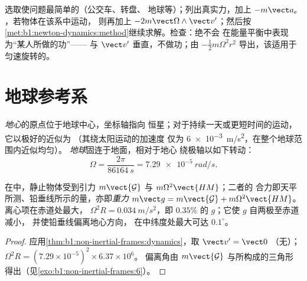 \begin{method}[在非惯性参考系中求解]\label{met:b1:non-inertial-frames:method}
选取使问题最简单的（公交车、转盘、
地球等）；列出真实力，加上 $-m\vect a_e$，若物体在该系中运动，
则再加上 $-2m\vect\Omega\wedge\vect v'$；然后按
\cref{met:b1:newton-dynamics:method}继续求解。检查：绝不会
在能量平衡中表现为“某人所做的功”——
与 $\vect v'$ 垂直，不做功；由
$-\tfrac12 m\Omega^2r^2$ 导出，该适用于
匀速旋转的。
\end{method}

\section{地球参考系}

\begin{definition}[地心参考系与地球参考系]\label{def:b1:non-inertial-frames:earth}
\emph{地心}的原点位于地球中心，坐标轴指向
恒星；对于持续一天或更短时间的运动，它以极好的近似为
（其绕太阳运动的加速度
仅为 \qty{6e-3}{m/s^2}，在整个地球范围内近似均匀）。
\emph{地球}固连于地面，相对于地心
绕极轴以如下转动：
\[
\Omega = \frac{2\pi}{\qty{86164}{s}} = \qty{7.29e-5}{rad/s} .
\]
\end{definition}

\begin{proposition}[重力，以及 $g$ 的变化]\label{prop:b1:non-inertial-frames:weight}
在中，静止物体受到引力
$m\vect{\mathcal G}$ 与 $m\Omega^2\vect{HM}$；二者的
合力即天平所测、铅垂线所示的量，亦即\emph{重力}
$m\vect g = m\vect{\mathcal G} + m\Omega^2\vect{HM}$。离心项在赤道处最大，
$\Omega^2R = \qty{0.034}{m/s^2}$，即 $0.35\%$ 的 $g$；它使 $g$ 自两极至赤道减小，
并使铅垂线偏离地心方向，
在中纬度处最大可达 $0.1^\circ$。
\end{proposition}

\begin{proof}
应用\cref{thm:b1:non-inertial-frames:dynamics}，取 $\vect v' = \vect 0$
（无）；$\Omega^2R = (7.29\times10^{-5})^2 \times 6.37\times10^6$。
偏离角由 $m\vect{\mathcal G}$ 与所构成的三角形
得出（见\cref{exo:b1:non-inertial-frames:6}）。
\end{proof}


